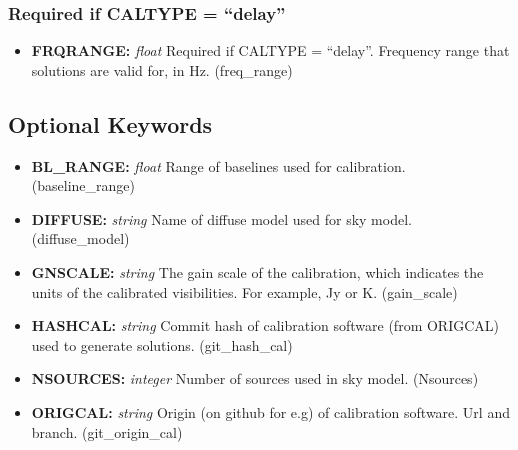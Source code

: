 \documentclass[11pt, oneside, english]{article}   	%
\begin{document}
	
	\subsubsection{Required if CALTYPE = ``delay''}
	\begin{itemize}
	\item{\textbf{FRQRANGE:} \emph{float} Required if CALTYPE = ``delay''. Frequency range that solutions are valid for, in Hz. (freq\_range)}
	\end{itemize}
	
	
\subsection{Optional Keywords}
\begin{itemize}
\item{\textbf{BL\_RANGE:} \emph{float} Range of baselines used for calibration. (baseline\_range)}
\item{\textbf{DIFFUSE:} \emph{string} Name of diffuse model used for sky model. (diffuse\_model)}
\item{\textbf{GNSCALE:} \emph{string} The gain scale of the calibration, which indicates the units of the calibrated visibilities. For example, Jy or K. (gain\_scale)}
\item{\textbf{HASHCAL:} \emph{string} Commit hash of calibration software (from ORIGCAL) used to generate solutions. (git\_hash\_cal)}
\item{\textbf{NSOURCES:} \emph{integer} Number of sources used in sky model. (Nsources)}
\item{\textbf{ORIGCAL:} \emph{string} Origin (on github for e.g) of calibration software. Url and branch. (git\_origin\_cal)}
\end{itemize}

\end{document}
